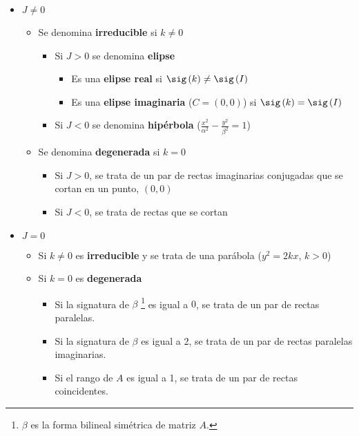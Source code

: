 \begin{itemize}
\item $\displaystyle J \neq 0 $ 
	\begin{itemize}
	\item Se denomina \textbf{irreducible} si $\displaystyle k \neq 0 $ 
		\begin{itemize}
		\item Si $\displaystyle J > 0 $ se denomina \textbf{elipse} 
			\begin{itemize}
			\item Es una \textbf{elipse real} si $\displaystyle \sig\left(k\right) \neq \sig\left(I\right) $ 
			\item Es una \textbf{elipse imaginaria} ($\displaystyle C = \left(0,0\right) $) si $\displaystyle \sig\left(k\right) = \sig\left(I\right) $
			\end{itemize}
		\item Si $\displaystyle J < 0 $ se denomina \textbf{hipérbola} ($\displaystyle \frac{x^{2}}{\alpha^{2}} - \frac{y^{2}}{\beta ^{2}} = 1 $)	
		\end{itemize}
	\item Se denomina \textbf{degenerada} si $\displaystyle k = 0 $
		\begin{itemize}
		\item Si $\displaystyle J > 0 $, se trata de un par de rectas imaginarias conjugadas que se cortan en un punto, $\displaystyle \left(0,0\right) $ 
		\item Si $\displaystyle J < 0 $, se trata de rectas que se cortan
		\end{itemize}
	\end{itemize}
\item $\displaystyle J = 0 $ 
	\begin{itemize}
	\item Si $\displaystyle k \neq 0 $ es \textbf{irreducible} y se trata de una parábola ($\displaystyle y^{2} = 2kx  $, $\displaystyle k > 0 $) 
	\item Si $\displaystyle k = 0 $ es \textbf{degenerada} 
		\begin{itemize}
		\item Si la signatura de $\displaystyle \beta  $ \footnote{$\displaystyle \beta  $ es la forma bilineal simétrica de matriz $\displaystyle A $.} es igual a $\displaystyle 0 $, se trata de un par de rectas paralelas.
		\item Si la signatura de $\displaystyle \beta  $ es igual a 2, se trata de un par de rectas paralelas imaginarias.
		\item Si el rango de $\displaystyle A $ es igual a 1, se trata de un par de rectas coincidentes.
		\end{itemize}
	\end{itemize}
\end{itemize}
